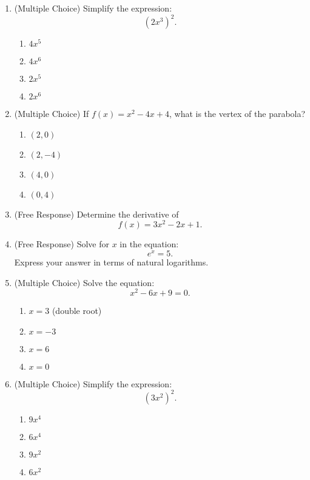 \documentclass[12pt]{article}
\begin{document}
\begin{enumerate}[label=\textbf{Question \arabic*:}]
  \item (Multiple Choice) Simplify the expression:
    \[
    (2x^3)^2.
    \]
    \begin{enumerate}[label=(\Alph*)]
      \item \(4x^5\)
      \item \(4x^6\)
      \item \(2x^5\)
      \item \(2x^6\)
    \end{enumerate}
    
  \item (Multiple Choice) If \(f(x) = x^2 - 4x + 4\), what is the vertex of the parabola?
    \begin{enumerate}[label=(\Alph*)]
      \item \((2, 0)\)
      \item \((2, -4)\)
      \item \((4, 0)\)
      \item \((0, 4)\)
    \end{enumerate}
    
  \item (Free Response) Determine the derivative of 
    \[
    f(x) = 3x^2 - 2x + 1.
    \]
    
  \item (Free Response) Solve for \(x\) in the equation:
    \[
    e^x = 5.
    \]
    Express your answer in terms of natural logarithms.

    \item (Multiple Choice) Solve the equation:
    \[
    x^2 - 6x + 9 = 0.
    \]
    \begin{enumerate}[label=(\Alph*)]
      \item \(x = 3\) (double root)
      \item \(x = -3\)
      \item \(x = 6\)
      \item \(x = 0\)
    \end{enumerate}
    
  \item (Multiple Choice) Simplify the expression:
    \[
    (3x^2)^2.
    \]
    \begin{enumerate}[label=(\Alph*)]
      \item \(9x^4\)
      \item \(6x^4\)
      \item \(9x^2\)
      \item \(6x^2\)
    \end{enumerate}
    

\end{enumerate}
\end{document}
